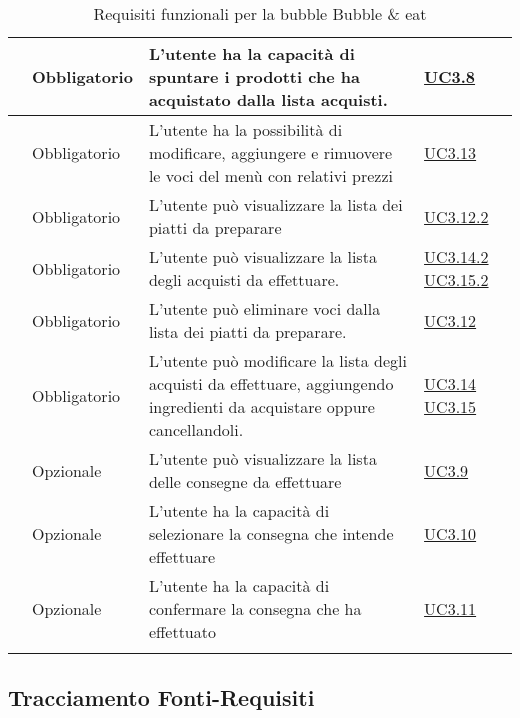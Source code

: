 \begin{longtable}{|P{1.5cm}|P{2.5cm}|P{6.5cm}|P{2.5cm}|}
	\hline \RequisitoObF\label{L28} & Obbligatorio & L'utente  ha la capacità di spuntare i prodotti che ha acquistato dalla lista acquisti.
	 & \hyperref[UC3.8]{UC3.8} \\
	\hline \RequisitoObF\label{L29} & Obbligatorio & L'utente  ha la possibilità di modificare, aggiungere e rimuovere le voci del menù con relativi prezzi & \hyperref[UC3.13]{UC3.13} \\
	\hline \RequisitoObF\label{L30} & Obbligatorio & L'utente  può visualizzare la lista dei piatti da preparare & \hyperref[UC3.12.2]{UC3.12.2} \\
	\hline \RequisitoObF\label{L31} & Obbligatorio & L'utente  può visualizzare la lista degli acquisti da effettuare. & \hyperref[UC3.14.2]{UC3.14.2} \hyperref[UC3.15.2]{UC3.15.2} \\
	\hline \RequisitoObF\label{L32} & Obbligatorio & L'utente  può eliminare voci dalla lista dei piatti da preparare. & \hyperref[UC3.12]{UC3.12} \\
	\hline \RequisitoObF\label{L53} & Obbligatorio & L'utente  può modificare la lista degli acquisti da effettuare, aggiungendo ingredienti da acquistare oppure cancellandoli.
	 & \hyperref[UC3.14]{UC3.14} \linebreak \hyperref[UC3.15]{UC3.15} \\	 
	\hline \RequisitoOpF\label{L50} & Opzionale & L'utente  può visualizzare la lista delle consegne da effettuare & \hyperref[UC3.9]{UC3.9} \\
	\hline \RequisitoOpF\label{L51} & Opzionale & L'utente  ha la capacità di selezionare la consegna che intende effettuare & \hyperref[UC3.10]{UC3.10} \\
	\hline \RequisitoOpF\label{L52} & Opzionale & L'utente  ha la capacità di confermare la consegna che ha effettuato & \hyperref[UC3.11]{UC3.11} \\
	\hline
	\caption{Requisiti funzionali per la bubble Bubble \& eat}
\end{longtable}

\subsection{Tracciamento Fonti-Requisiti}

